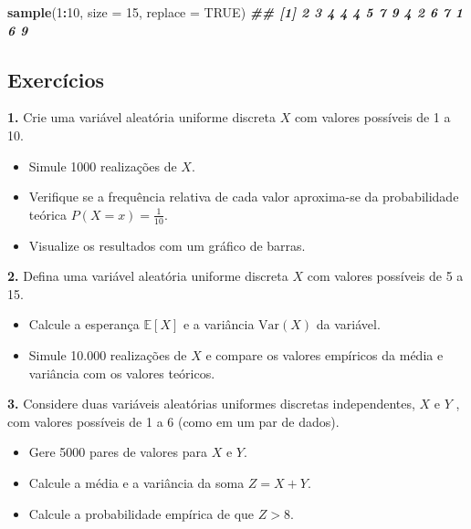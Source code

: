 \documentclass[
]{book}
\newenvironment{Shaded}{\begin{snugshade}}{\end{snugshade}}
\newcommand{\AttributeTok}[1]{\textcolor[rgb]{0.13,0.29,0.53}{#1}}
\newcommand{\ConstantTok}[1]{\textcolor[rgb]{0.56,0.35,0.01}{#1}}
\newcommand{\DecValTok}[1]{\textcolor[rgb]{0.00,0.00,0.81}{#1}}
\newcommand{\DocumentationTok}[1]{\textcolor[rgb]{0.56,0.35,0.01}{\textbf{\textit{#1}}}}
\newcommand{\FunctionTok}[1]{\textcolor[rgb]{0.13,0.29,0.53}{\textbf{#1}}}
\newcommand{\NormalTok}[1]{#1}
\newcommand{\SpecialCharTok}[1]{\textcolor[rgb]{0.81,0.36,0.00}{\textbf{#1}}}
\providecommand{\tightlist}{%
  \setlength{\itemsep}{0pt}\setlength{\parskip}{0pt}}
\begin{document}
\begin{Shaded}
\begin{Highlighting}[]
\FunctionTok{sample}\NormalTok{(}\DecValTok{1}\SpecialCharTok{:}\DecValTok{10}\NormalTok{, }\AttributeTok{size =} \DecValTok{15}\NormalTok{, }\AttributeTok{replace =} \ConstantTok{TRUE}\NormalTok{)}
\DocumentationTok{\#\# [1] 2 3 4 4 4 5 7 9 4 2 6 7 1 6 9}
\end{Highlighting}
\end{Shaded}

\subsection{Exercícios}\label{exercuxedcios-24}

\textbf{1.} Crie uma variável aleatória uniforme discreta \(X\) com valores possíveis de 1 a 10.

\begin{itemize}
\tightlist
\item
  Simule 1000 realizações de \(X\).
\item
  Verifique se a frequência relativa de cada valor aproxima-se da probabilidade teórica \(P(X = x) = \frac{1}{10}\).
\item
  Visualize os resultados com um gráfico de barras.
\end{itemize}

\textbf{2.} Defina uma variável aleatória uniforme discreta \(X\) com valores possíveis de 5 a 15.

\begin{itemize}
\tightlist
\item
  Calcule a esperança \(\mathbb{E}[X]\) e a variância \(\text{Var}(X)\) da variável.
\item
  Simule 10.000 realizações de \(X\) e compare os valores empíricos da média e variância com os valores teóricos.
\end{itemize}

\textbf{3.} Considere duas variáveis aleatórias uniformes discretas independentes, \(X\) e \(Y\) , com valores possíveis de 1 a 6 (como em um par de dados).

\begin{itemize}
\tightlist
\item
  Gere 5000 pares de valores para \(X\) e \(Y\).
\item
  Calcule a média e a variância da soma \(Z = X + Y\).
\item
  Calcule a probabilidade empírica de que \(Z > 8\).
\end{itemize}
\end{document}
